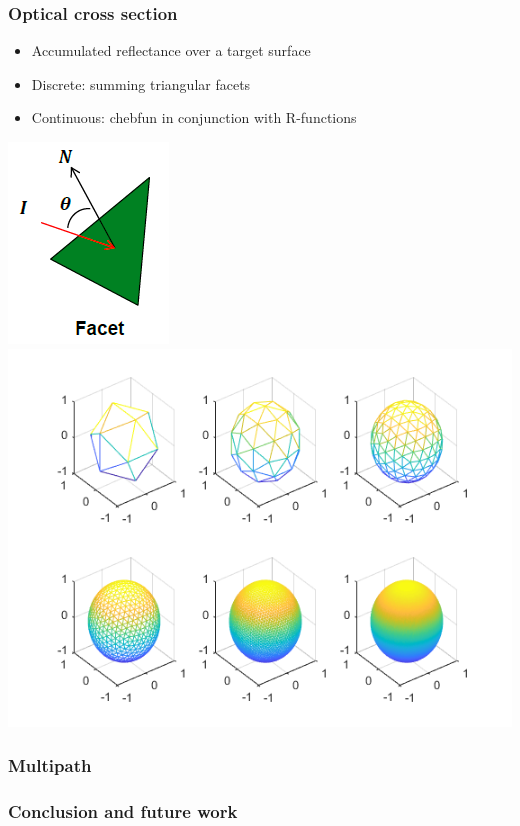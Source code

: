 \documentclass{beamer}
\begin{document}
\begin{frame}[t]
\frametitle{Optical cross section}
\begin{itemize}
\item Accumulated reflectance over a target surface
\item Discrete: summing triangular facets
\item Continuous: chebfun in conjunction with R-functions
\end{itemize}
\centerline{\includegraphics[scale = 0.5]{./figs/facet.png} \: \includegraphics[scale = 0.5]{./figs/icosahedron.png}}
\end{frame}

\begin{frame}[t]
\frametitle{Multipath}

\end{frame}

\begin{frame}[t]
\frametitle{Conclusion and future work}

\end{frame}
\end{document}
